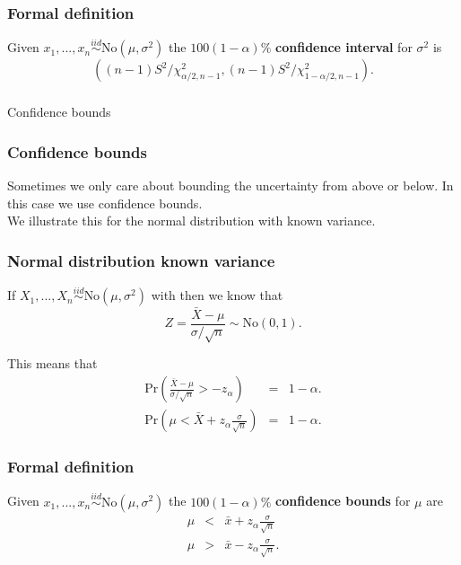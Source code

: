 \begin{frame}[fragile]\frametitle{Formal definition}

\begin{defn}
Given $x_1,...,x_n \stackrel{iid}{\sim} \mbox{No}(\mu,\sigma^2)$
the $100(1-\alpha)\%$ {\bf confidence interval} for $\sigma^2$
is
$$\left( (n-1)S^2/\chi^2_{\alpha/2,n-1},
  (n-1)S^2/\chi^2_{1-\alpha/2,n-1} \right).$$
\end{defn}
\end{frame}

\begin{frame}[fragile]\frametitle{}
\begin{center}
{\Large Confidence bounds}

\end{center}
\end{frame}


\begin{frame}[fragile]\frametitle{Confidence bounds}

Sometimes we only care about bounding the uncertainty from above
or below. In this case we use confidence bounds. \\ 

We illustrate this for the normal distribution with known
variance.

\end{frame}

\begin{frame}[fragile]\frametitle{Normal distribution known variance}

If $X_1,...,X_n \stackrel{iid}{\sim} \mbox{No}(\mu,\sigma^2)$
with then we know that 
$$Z = \frac{\bar{X}-\mu}{\sigma / \sqrt{n}} \sim\mbox{No}(0,1).$$ 

This means that
\begin{eqnarray*}
\mbox{Pr}\left( \frac{\bar{X}-\mu}{\sigma / \sqrt{n}} > -z_{\alpha} \right) &= &1 - \alpha. \\ 
\mbox{Pr}\left(\mu  < \bar{X} + z_\alpha \frac{\sigma}{\sqrt{n}}\right) &= &1 - \alpha.
\end{eqnarray*}

\end{frame}

\begin{frame}[fragile]\frametitle{Formal definition}

\begin{defn}
Given $x_1,...,x_n \stackrel{iid}{\sim} \mbox{No}(\mu,\sigma^2)$
the $100(1-\alpha)\%$ {\bf confidence bounds} for $\mu$
are
\begin{eqnarray*}
\mu & < &\bar{x} + z_\alpha \frac{\sigma}{\sqrt{n}} \\
\mu & > &\bar{x} - z_\alpha \frac{\sigma}{\sqrt{n}}.
\end{eqnarray*}
\end{defn}

\end{frame}

